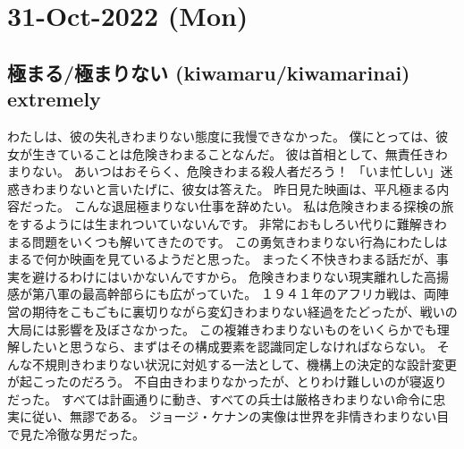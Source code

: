 \section{31-Oct-2022 (Mon)}
\subsection{極まる/極まりない (kiwamaru/kiwamarinai) extremely}

わたしは、彼の失礼きわまりない態度に我慢できなかった。
僕にとっては、彼女が生きていることは危険きわまることなんだ。
彼は首相として、無責任きわまりない。
あいつはおそらく、危険きわまる殺人者だろう！
「いま忙しい」迷惑きわまりないと言いたげに、彼女は答えた。
昨日見た映画は、平凡極まる内容だった。
こんな退屈極まりない仕事を辞めたい。
私は危険きわまる探検の旅をするようには生まれついていないんです。
非常におもしろい代りに難解きわまる問題をいくつも解いてきたのです。
この勇気きわまりない行為にわたしはまるで何か映画を見ているようだと思った。
まったく不快きわまる話だが、事実を避けるわけにはいかないんですから。
危険きわまりない現実離れした高揚感が第八軍の最高幹部らにも広がっていた。
１９４１年のアフリカ戦は、両陣営の期待をこもごもに裏切りながら変幻きわまりない経過をたどったが、戦いの大局には影響を及ぼさなかった。
この複雑きわまりないものをいくらかでも理解したいと思うなら、まずはその構成要素を認識同定しなければならない。
そんな不規則きわまりない状況に対処する一法として、機構上の決定的な設計変更が起こったのだろう。
不自由きわまりなかったが、とりわけ難しいのが寝返りだった。
すべては計画通りに動き、すべての兵士は厳格きわまりない命令に忠実に従い、無謬である。
ジョージ・ケナンの実像は世界を非情きわまりない目で見た冷徹な男だった。
